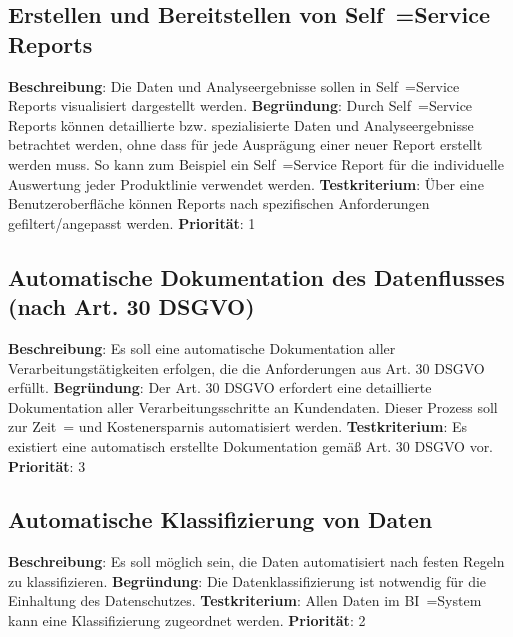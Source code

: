 \subsection{Erstellen und Bereitstellen von Self~=Service Reports} \label{sec:anforderungsspezifikation:selfServiceReports}
\textbf{Beschreibung}: Die Daten und Analyseergebnisse sollen in Self~=Service Reports visualisiert dargestellt werden.
\newline \textbf{Begründung}: Durch Self~=Service Reports können detaillierte bzw. spezialisierte Daten und Analyseergebnisse betrachtet werden, ohne dass für jede Ausprägung einer neuer Report erstellt werden muss. So kann zum Beispiel ein Self~=Service Report für die individuelle Auswertung jeder Produktlinie verwendet werden.
\newline \textbf{Testkriterium}: Über eine Benutzeroberfläche können Reports nach spezifischen Anforderungen gefiltert/angepasst werden.
\newline \textbf{Priorität}: 1

\subsection[Automatische Dokumentation des Datenflusses]{Automatische Dokumentation des Datenflusses (nach Art. 30 DSGVO)} \label{sec:anforderungsspezifikation:datenflussDokumentation}
\textbf{Beschreibung}: Es soll eine automatische Dokumentation aller Verarbeitungstätigkeiten erfolgen, die die Anforderungen aus Art. 30 DSGVO erfüllt.
\newline \textbf{Begründung}: Der Art. 30 DSGVO erfordert eine detaillierte Dokumentation aller Verarbeitungsschritte an Kundendaten. Dieser Prozess soll zur Zeit~= und Kostenersparnis automatisiert werden.
\newline \textbf{Testkriterium}: Es existiert eine automatisch erstellte Dokumentation gemäß Art. 30 DSGVO vor.
\newline \textbf{Priorität}: 3

\subsection{Automatische Klassifizierung von Daten} \label{sec:anforderungsspezifikation:DatenKlassifizierung}
\textbf{Beschreibung}: Es soll möglich sein, die Daten automatisiert nach festen Regeln zu klassifizieren. 
\newline \textbf{Begründung}: Die Datenklassifizierung ist notwendig für die Einhaltung des Datenschutzes.
\newline \textbf{Testkriterium}: Allen Daten im BI~=System kann eine Klassifizierung zugeordnet werden.
\newline \textbf{Priorität}: 2

